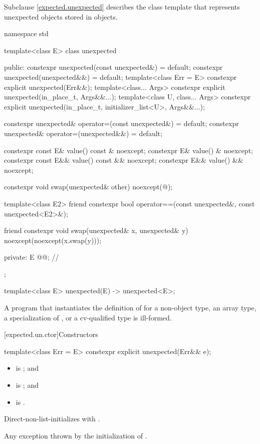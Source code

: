 \pnum
Subclause \ref{expected.unexpected} describes the class template 
that represents unexpected objects stored in  objects.

%
\begin{codeblock}
namespace std {
  template<class E>
  class unexpected {
  public:
    constexpr unexpected(const unexpected&) = default;
    constexpr unexpected(unexpected&&) = default;
    template<class Err = E>
      constexpr explicit unexpected(Err&&);
    template<class... Args>
      constexpr explicit unexpected(in_place_t, Args&&...);
    template<class U, class... Args>
      constexpr explicit unexpected(in_place_t, initializer_list<U>, Args&&...);

    constexpr unexpected& operator=(const unexpected&) = default;
    constexpr unexpected& operator=(unexpected&&) = default;

    constexpr const E& value() const & noexcept;
    constexpr E& value() & noexcept;
    constexpr const E&& value() const && noexcept;
    constexpr E&& value() && noexcept;

    constexpr void swap(unexpected& other) noexcept(@\seebelow@);

    template<class E2>
      friend constexpr bool operator==(const unexpected&, const unexpected<E2>&);

    friend constexpr void swap(unexpected& x, unexpected& y) noexcept(noexcept(x.swap(y)));

  private:
    E @@;               // \expos
  };

  template<class E> unexpected(E) -> unexpected<E>;
}
\end{codeblock}

\pnum
A program that instantiates the definition of  for
a non-object type,
an array type,
a specialization of , or
a cv-qualified type
is ill-formed.

[expected.un.ctor]{Constructors}

%
\begin{itemdecl}
template<class Err = E>
  constexpr explicit unexpected(Err&& e);
\end{itemdecl}

\begin{itemdescr}
\pnum
\constraints
\begin{itemize}
\item
{} is ; and
\item
{} is ; and
\item
{} is .
\end{itemize}

\pnum
\effects
Direct-non-list-initializes  with .

\pnum
\throws
Any exception thrown by the initialization of .
\end{itemdescr}

